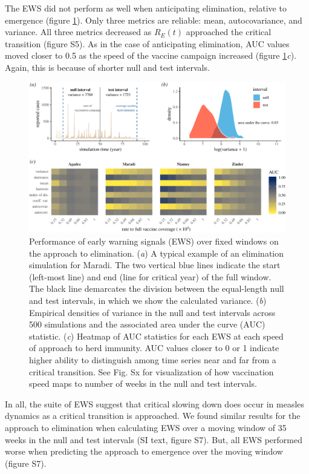\documentclass[3p]{elsarticle} %
\makeatletter
\def\maxwidth{\ifdim\Gin@nat@width>\linewidth\linewidth
\else\Gin@nat@width\fi}
\let\Oldincludegraphics\includegraphics
\renewcommand{\includegraphics}[1]{\Oldincludegraphics[width=\maxwidth]{#1}}
\makeatother
\begin{document}
The EWS did not perform as well when anticipating elimination, relative
to emergence (figure \ref{elim-aucs}). Only three metrics are reliable:
mean, autocovariance, and variance. All three metrics decreased as
\(R_E(t)\) approached the critical transition (figure S5). As in the
case of anticipating elimination, AUC values moved closer to 0.5 as the
speed of the vaccine campaign increased (figure
\ref{elim-aucs}\emph{c}). Again, this is because of shorter null and
test intervals.

\begin{figure}
\centering
\includegraphics{measles-ews-manuscript_files/figure-latex/elimination-1.pdf}
\caption{Performance of early warning signals (EWS) over fixed windows
on the approach to elimination. (\emph{a}) A typical example of an
elimination simulation for Maradi. The two vertical blue lines indicate
the start (left-most line) and end (line for critical year) of the full
window. The black line demarcates the division between the equal-length
null and test intervals, in which we show the calculated variance.
(\emph{b}) Empirical densities of variance in the null and test
intervals across 500 simulations and the associated area under the curve
(AUC) statistic. (\emph{c}) Heatmap of AUC statistics for each EWS at
each speed of approach to herd immunity. AUC values closer to 0 or 1
indicate higher ability to distinguish among time series near and far
from a critical transition. See Fig. Sx for visualization of how
vaccination speed maps to number of weeks in the null and test
intervals. \label{elim-aucs}}
\end{figure}

In all, the suite of EWS suggest that critical slowing down does occur
in measles dynamics as a critical transition is approached. We found
similar results for the approach to elimination when calculating EWS
over a moving window of 35 weeks in the null and test intervals (SI
text, figure S7). But, all EWS performed worse when predicting the
approach to emergence over the moving window (figure S7). \ignorespaces
\end{document}
